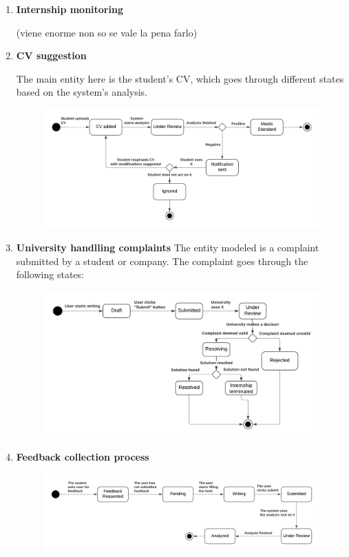\begin{enumerate}
\item \textbf{Internship monitoring}

(viene enorme non so se vale la pena farlo)
\item \textbf{CV suggestion}

The main entity here is the student’s CV, which goes through different states based on the system’s analysis.

\begin{figure}[H]
    \centering
    \includegraphics[width=1\linewidth]{RASD//Images/CV.png}
    \caption{}
    \label{fig:enter-label}
\end{figure}

\item \textbf{University handlling complaints}
The entity modeled is a complaint submitted by a student or company. The complaint goes through the following states:

\begin{figure}[H]
    \centering
    \includegraphics[width=1\linewidth]{RASD//Images/Complaints.png}
    \caption{}
    \label{fig:enter-label}
\end{figure}


\item \textbf{Feedback collection process}
\begin{figure}[H]
    \centering
    \includegraphics[width=1\linewidth]{RASD//Images/feedback.png}
    \caption{}
    \label{fig:enter-label}
\end{figure}

\end{enumerate}

